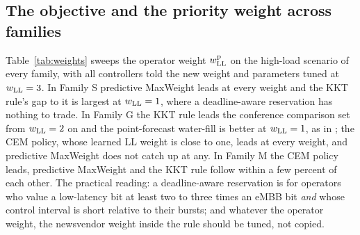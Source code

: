 \documentclass[journal]{IEEEtran}
\begin{document}
\begin{table}[t]
\caption{Family S, high load: $V_w$ (\%) against the control interval $T$ (\xnSeedsSweep{} seeds)}
\label{tab:sweep}
\centering
\scriptsize

\end{table}

\subsection{The objective and the priority weight across families}
\label{sec:weights}
Table~\ref{tab:weights} sweeps the operator weight $w^{\rm p}_{\rm LL}$ on the high-load scenario of every family, with all controllers told the new weight and parameters tuned at $w_{\rm LL} = 3$. In Family S predictive MaxWeight leads at every weight and the KKT rule's gap to it is largest at $w_{\rm LL} = 1$, where a deadline-aware reservation has nothing to trade. In Family G the KKT rule leads the conference comparison set from $w_{\rm LL} = 2$ on and the point-forecast water-fill is better at $w_{\rm LL} = 1$, as in \cite{ncc2027}; the CEM policy, whose learned LL weight is close to one, leads at every weight, and predictive MaxWeight does not catch up at any. In Family M the CEM policy leads, predictive MaxWeight and the KKT rule follow within a few percent of each other. The practical reading: a deadline-aware reservation is for operators who value a low-latency bit at least two to three times an eMBB bit \emph{and} whose control interval is short relative to their bursts; and whatever the operator weight, the newsvendor weight inside the rule should be tuned, not copied.

\begin{table}[t]
\caption{Operator LL weight sweep at high load in the three families: $V_w$ (\%, \xnSeedsWeights{} seeds; parameters tuned at $w_{\rm LL} = 3$)}
\label{tab:weights}
\centering
\scriptsize
\setlength{\tabcolsep}{3pt}

\end{table}
\end{document}
